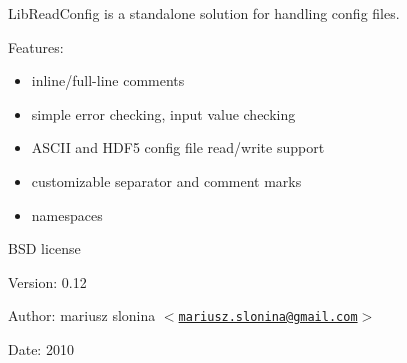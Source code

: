 LibReadConfig is a standalone solution for handling config files.

Features:\begin{itemize}
\item inline/full-line comments\item simple error checking, input value checking\item ASCII and HDF5 config file read/write support\item customizable separator and comment marks\item namespaces\end{itemize}


BSD license

\begin{Desc}
\item[Version:]0.12\end{Desc}
\begin{Desc}
\item[Author:]mariusz slonina $<$\href{mailto:mariusz.slonina@gmail.com}{\tt mariusz.slonina@gmail.com}$>$ \end{Desc}
\begin{Desc}
\item[Date:]2010 \end{Desc}
